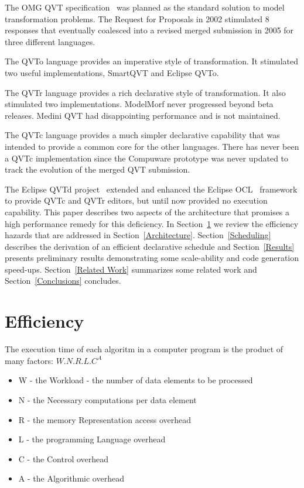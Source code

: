 \documentclass{llncs}
\begin{document}
The OMG QVT specification~\cite{QVT-1.3-Beta} was planned as the standard solution to model transformation problems. The Request for Proposals in 2002 stimulated 8 responses that eventually coalesced into a revised merged submission in 2005 for three different languages.

The QVTo language provides an imperative style of transformation. It stimulated two useful implementations, SmartQVT and Eclipse QVTo. %

The QVTr language provides a rich declarative style of transformation. It also stimulated two implementations. ModelMorf never progressed beyond beta releases. 
Medini QVT had disappointing performance and is not maintained.

The QVTc language provides a much simpler declarative capability that was intended to provide a common core for the other languages. There has never been a QVTc implementation since the Compuware prototype was never updated to track the evolution of the merged QVT submission.

The Eclipse QVTd project~\cite{Eclipse-QVTd} extended and enhanced the Eclipse OCL~\cite{Eclipse-OCL} framework to provide QVTc and QVTr editors, but until now provided no execution capability. This paper describes two aspects of the architecture that promises a high performance remedy for this deficiency. In Section~\ref{Efficiency} we review the efficiency hazards that are addressed in Section~\ref{Architecture}. Section~\ref{Scheduling} describes the derivation of an efficient declarative schedule and Section~\ref{Results} presents preliminary results demonstrating some scale-ability and code generation speed-ups. Section~\ref{Related Work} summarizes some related work and Section~\ref{Conclusions} concludes.

\section{Efficiency}\label{Efficiency}

The execution time of each algoritm in a computer program is the product of many factors: \(W.N.R.L.C^A\)
\begin{itemize}
\item W - the Workload - the number of data elements to be processed
\item N - the Necessary computations per data element
\item R - the memory Representation access overhead
\item L - the programming Language overhead
\item C - the Control overhead
\item A - the Algorithmic overhead
\end{itemize}
\end{document}

